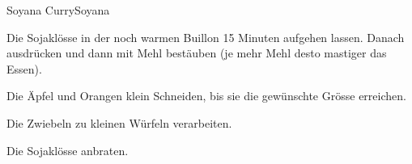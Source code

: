 
\begin{recipe}[]{Soyana Curry}{Soyana}{}




\step
Die Sojakl\"osse in der noch warmen Buillon 15 Minuten aufgehen lassen. Danach ausdr\"ucken und dann mit Mehl best\"auben (je mehr Mehl desto mastiger das Essen).

\step
Die \"Apfel und Orangen klein Schneiden, bis sie die gew\"unschte Gr\"osse erreichen.

\step
Die Zwiebeln zu kleinen W\"urfeln verarbeiten.

\step
Die Sojakl\"osse anbraten.


\end{recipe}
